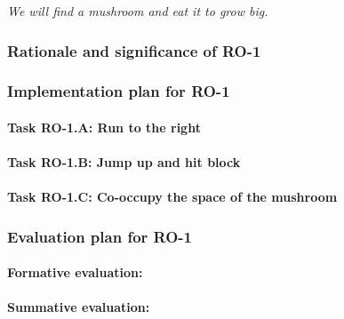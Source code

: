 \textit{We will find a mushroom and eat it to grow big.}



\vspace{-10pt}
\subsubsection{Rationale and significance of RO-1}
\vspace{-6pt}

\lipsum[2]




\vspace{-10pt}
\subsubsection{Implementation plan for RO-1}
\vspace{-6pt}


\paragraph*{Task RO-1.A: Run to the right}
\lipsum[1]

\paragraph*{Task RO-1.B: Jump up and hit block}
\lipsum[1]

\paragraph*{Task RO-1.C: Co-occupy the space of the mushroom}
\lipsum[1]

\vspace{-10pt}
\subsubsection{Evaluation plan for RO-1}

\vspace{-8pt}
\paragraph*{Formative evaluation:} 
\lipsum[1]

\vspace{-14pt}
\paragraph*{Summative evaluation:} 
\lipsum[1]


